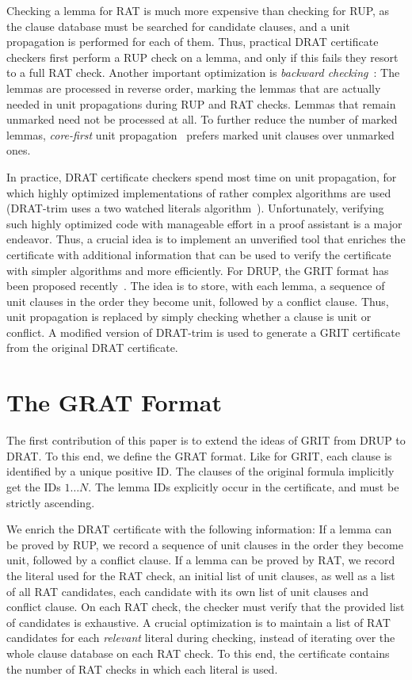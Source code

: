 \documentclass{llncs}
\begin{document}
Checking a lemma for RAT is much more expensive than checking for RUP, as the clause database must be searched for candidate clauses,
and a unit propagation is performed for each of them. Thus, practical DRAT certificate checkers first perform a RUP check on a lemma, and only if 
this fails they resort to a full RAT check. 
Another important optimization is \emph{backward checking}~\cite{GoNo03,HHW13}: The lemmas are processed in reverse order, marking the lemmas that are actually needed 
in unit propagations during RUP and RAT checks. Lemmas that remain unmarked need not be processed at all. To further reduce the number of marked lemmas, 
\emph{core-first} unit propagation~\cite{WHH14} prefers marked unit clauses over unmarked ones.

In practice, DRAT certificate checkers spend most time on unit propagation, for which highly optimized implementations of rather complex algorithms 
are used (\eg DRAT-trim uses a two watched literals algorithm~\cite{MMZZ01}).
Unfortunately, verifying such highly optimized code with manageable effort in a proof assistant is a major endeavor.
Thus, a crucial idea is to implement an unverified tool that enriches the certificate with additional information that can be used to verify 
the certificate with simpler algorithms and more efficiently. For DRUP, the GRIT format has been proposed recently~\cite{CMS16}. 
The idea is to store, with each lemma, a sequence of unit clauses in the order they become unit, followed by a conflict clause. Thus, unit propagation is replaced by 
simply checking whether a clause is unit or conflict. A modified version of DRAT-trim is used to generate a GRIT certificate from the original DRAT certificate.


\section{The GRAT Format}\label{sec:grat-format}
The first contribution of this paper is to extend the ideas of GRIT from DRUP to DRAT.
To this end, we define the GRAT format. 
Like for GRIT, each clause is identified by a unique positive ID. 
The clauses of the original formula implicitly get the IDs $1\ldots N$. The lemma IDs explicitly occur in the certificate, and must be strictly ascending.

We enrich the DRAT certificate with the following information: If a lemma can be proved by RUP, we record a sequence of unit clauses in the order they become unit, 
followed by a conflict clause. If a lemma can be proved by RAT, we record the literal used for the RAT check, an initial list of unit clauses, as well as a list of all 
RAT candidates, each candidate with its own list of unit clauses and conflict clause.
On each RAT check, the checker must verify that the provided list of candidates is exhaustive.
A crucial optimization is to maintain a list of RAT candidates for each \emph{relevant} literal during checking, instead of iterating 
over the whole clause database on each RAT check. To this end, the certificate contains the number of RAT checks in which each literal is used.
\end{document}
